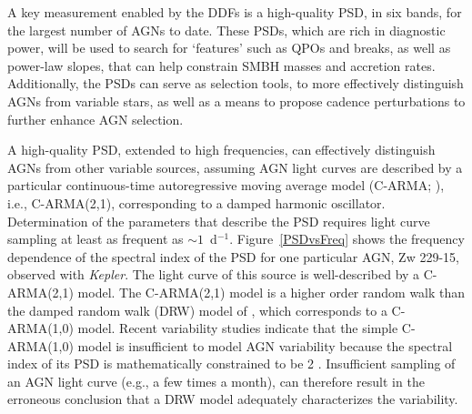 A key measurement enabled by the DDFs is a high-quality PSD, in six bands,
for the largest number of AGNs to date. These PSDs, which are rich
in diagnostic power, will be used to search for `features' such as QPOs
and breaks, as well as power-law slopes, that can help constrain SMBH masses
and accretion rates. Additionally, the PSDs can serve as selection
tools, to more effectively distinguish AGNs from variable stars, as
well as a means to propose cadence perturbations to further enhance
AGN selection.

A high-quality PSD, extended to high frequencies, can effectively distinguish
AGNs from other variable sources, assuming AGN light curves are described by
a particular continuous-time autoregressive moving average model (C-ARMA;
\citet{KellyEtal2014}), i.e., C-ARMA(2,1), corresponding to a damped harmonic
oscillator.
%
Determination of the parameters that describe the PSD requires light curve
sampling at least as frequent as $\sim1$~d$^{-1}$. Figure~\ref{PSDvsFreq} shows
the frequency dependence of the spectral index of the PSD for one particular AGN,
Zw 229-15, observed with {\em Kepler}. The light curve of this source is
well-described by a C-ARMA(2,1) model. The C-ARMA(2,1) model is a higher order
random walk than the damped random walk (DRW) model of \citet{Kelly09}, which
corresponds to a C-ARMA(1,0) model. Recent variability studies indicate that
the simple C-ARMA(1,0) model is insufficient to model AGN variability because
the spectral index of its PSD is mathematically constrained to be 2
\citep{Kelly14,Kasliwal15,Simm15}. Insufficient sampling of an AGN light
curve (e.g., a few times a month), can therefore result in the erroneous conclusion
that a DRW model adequately characterizes the variability.


